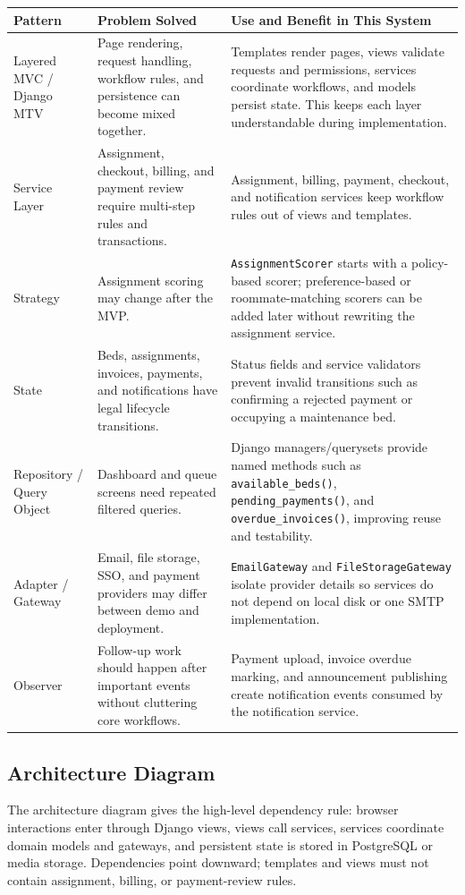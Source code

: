 \documentclass[11pt,a4paper]{article}
\begin{document}
\begin{longtable}{L{0.19\textwidth} L{0.30\textwidth} L{0.38\textwidth}}
\toprule
\textbf{Pattern} & \textbf{Problem Solved} & \textbf{Use and Benefit in This System}\\
\midrule
\endhead
Layered MVC / Django MTV & Page rendering, request handling, workflow rules, and persistence can become mixed together. & Templates render pages, views validate requests and permissions, services coordinate workflows, and models persist state. This keeps each layer understandable during implementation.\\
Service Layer & Assignment, checkout, billing, and payment review require multi-step rules and transactions. & Assignment, billing, payment, checkout, and notification services keep workflow rules out of views and templates.\\
Strategy & Assignment scoring may change after the MVP. & \texttt{AssignmentScorer} starts with a policy-based scorer; preference-based or roommate-matching scorers can be added later without rewriting the assignment service.\\
State & Beds, assignments, invoices, payments, and notifications have legal lifecycle transitions. & Status fields and service validators prevent invalid transitions such as confirming a rejected payment or occupying a maintenance bed.\\
Repository / Query Object & Dashboard and queue screens need repeated filtered queries. & Django managers/querysets provide named methods such as \texttt{available\_beds()}, \texttt{pending\_payments()}, and \texttt{overdue\_invoices()}, improving reuse and testability.\\
Adapter / Gateway & Email, file storage, SSO, and payment providers may differ between demo and deployment. & \texttt{EmailGateway} and \texttt{FileStorageGateway} isolate provider details so services do not depend on local disk or one SMTP implementation.\\
Observer & Follow-up work should happen after important events without cluttering core workflows. & Payment upload, invoice overdue marking, and announcement publishing create notification events consumed by the notification service.\\
\bottomrule
\end{longtable}

\subsection{Architecture Diagram}
The architecture diagram gives the high-level dependency rule: browser interactions enter through Django views, views call services, services coordinate domain models and gateways, and persistent state is stored in PostgreSQL or media storage. Dependencies point downward; templates and views must not contain assignment, billing, or payment-review rules.
\end{document}
